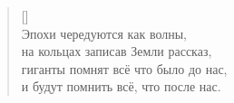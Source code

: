 \documentclass[a5paper,11pt]{memoir}
\begin{document}
\BgThispage



\begin{verse}[\versewidth]
	~\\	  %
	\hspace{-0.8cm}Эпохи чередуются как волны,\\
	\hspace{-0.8cm}на кольцах записав Земли рассказ,\\
	\hspace{-0.5cm}гиганты помнят всё что было до нас,\\
	\hspace{-0.5cm}и будут помнить всё, что после нас. 
\end{verse}
\newpage
\end{document}
